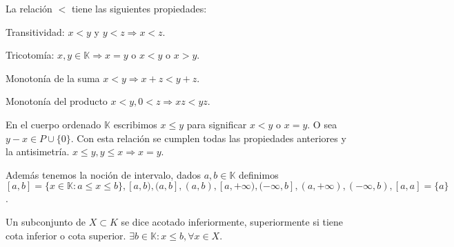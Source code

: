 La relación \(<\) tiene las siguientes propiedades:

\begin{prop}
    Transitividad: \(x<y\) y \(y<z \Rightarrow x<z\).
\end{prop}

\begin{prop}
    Tricotomía: \(x,y \in \mathbb{K} \Rightarrow x=y\) o \(x<y\) o \(x>y\).
\end{prop}

\begin{prop}
    Monotonía de la suma \(x<y \Rightarrow x+z<y+z\).
\end{prop}

\begin{prop}
    Monotonía del producto \(x<y, 0<z \Rightarrow xz <yz\).
\end{prop}

En el cuerpo ordenado \(\mathbb{K}\) escribimos \(x \leq y\) para significar \(x<y\) o \(x=y\). O sea \(y-x \in P \cup \{0\}\). Con esta relación se cumplen todas las propiedades anteriores y la antisimetría. \(x \leq y, y \leq x \Rightarrow x = y\).

Además tenemos la noción de intervalo, dados \(a,b \in \mathbb{K}\) definimos \([a,b ] = \{ x \in \mathbb{K} : a \leq x \leq b \}, [a, b), (a, b], (a,b), [a, +\infty), (-\infty, b], (a, +\infty), (-\infty, b), [a, a] = \{a\}\).

Un subconjunto de \(X \subset K\) se dice acotado inferiormente, superiormente si tiene cota inferior o cota superior. \(\exists b \in \mathbb{K}: x \leq b, \forall x \in X\).
